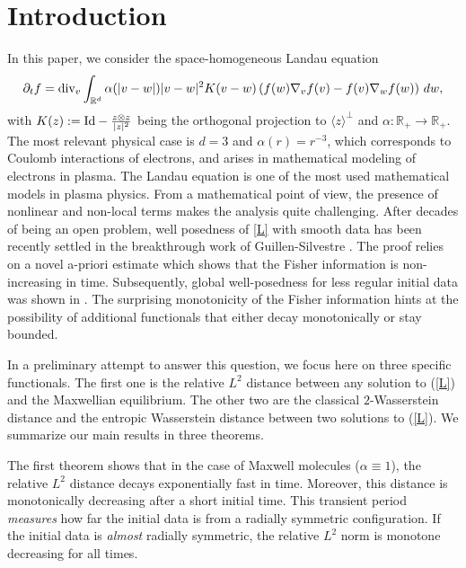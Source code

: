 \documentclass[11pt]{amsart}
\numberwithin{equation}{section}
\begin{document}


\section{Introduction}
In this paper, we consider the space-homogeneous Landau equation
\begin{equation}\label{L}
  \partial_t f = \textnormal{div}_{v}\int_{\mathbb{R}^{d}}
  \alpha(\vert v-w\vert )\vert v-w\vert^2 K(v-w)\left(f(w)\nabla_{v}f(v)-f(v)\nabla_{w}f(w)\right)\,dw,
\end{equation}
with $  K(z) := \textnormal{Id} - \frac{z\otimes z}{\vert z \vert^2}$ being the orthogonal projection to $\langle z\rangle^\perp$ and $\alpha:\mathbb{R}_+\longrightarrow\mathbb{R}_+$. 
The most relevant physical case is $d=3$ and $\alpha(r)=r^{-3}$, which corresponds to Coulomb interactions of electrons, and arises in mathematical modeling of electrons in plasma.  The Landau equation is one of the most used mathematical models in plasma physics. From a mathematical point of view, the presence of  nonlinear and non-local terms makes the analysis quite challenging. After decades of being an open problem, well posedness of \eqref{L} with smooth data has  been recently settled in the breakthrough work of Guillen-Silvestre \cite{GS24}. The proof relies on a novel a-priori estimate which shows that the Fisher information is non-increasing in time. Subsequently, global well-posedness for less regular initial data was shown in \cite{GoGuLo24, DGL24, Ji24, HJJ2025}.  The surprising monotonicity of the Fisher information hints at the possibility of additional functionals that either decay monotonically or stay bounded. 

In a preliminary attempt to answer this question, we focus here on three specific functionals. The first one is the relative $L^2$ distance between any solution to (\ref{L}) and the Maxwellian equilibrium. The other two are the classical $2$-Wasserstein distance and the  entropic Wasserstein distance between two solutions to (\ref{L}). We summarize our main results in three theorems. 


The first theorem shows that in the case of Maxwell molecules  ($\alpha\equiv 1$), the relative $L^2$ distance decays exponentially fast in time.  Moreover, this distance is monotonically decreasing  after a short initial time. This transient period {\em{measures}} how far the initial data is from a radially symmetric configuration. If the initial data is {\em{almost}} radially symmetric, the relative $L^2$ norm is monotone decreasing for all times. 
\end{document}
